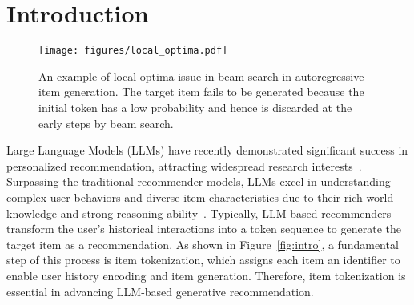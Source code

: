 \section{Introduction}\label{sec:introduction}

\begin{figure}[t]
\setlength{\abovecaptionskip}{0.02cm}
\setlength{\belowcaptionskip}{-0.3cm}
\centering
\texttt{[image: figures/local\_optima.pdf]}
\caption{An example of local optima issue in beam search in autoregressive item generation. The target item fails to be generated because the initial token has a low probability and hence is discarded at the early steps by beam search.}
\label{fig:local_optima}
\end{figure}

Large Language Models (LLMs) have recently demonstrated significant success in personalized recommendation, attracting widespread research interests~\cite{shi2024large,liao2024llara}.
Surpassing the traditional recommender models, LLMs excel in understanding complex user behaviors and diverse item characteristics due to their rich world knowledge and strong reasoning ability~\cite{touvron2023llama}. 
Typically, LLM-based recommenders transform the user's historical interactions into a token sequence to generate the target item as a recommendation. 
As shown in Figure~\ref{fig:intro}, a fundamental step of this process is item tokenization, which assigns each item an identifier to enable user history encoding and item generation. 
Therefore, item tokenization is essential in advancing LLM-based generative recommendation. 





